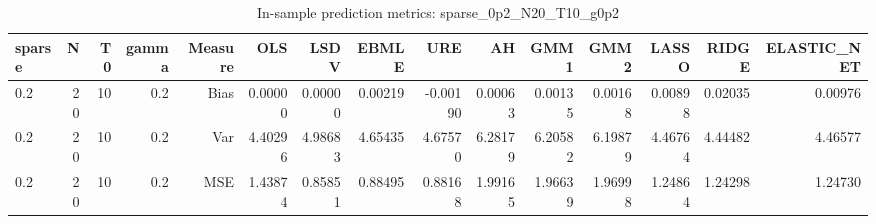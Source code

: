 \begin{table}[!htbp]\centering
\caption{In-sample prediction metrics: sparse_0p2_N20_T10_g0p2}
\label{tab:table2_sparse_0p2_N20_T10_g0p2}
\begin{tabular}{lrrrrrrrrrrrrrr}
\hline
sparse & N & T0 & gamma & Measure & OLS & LSDV & EBMLE & URE & AH & GMM1 & GMM2 & LASSO & RIDGE & ELASTIC_NET \\
\hline
0.2 & 20 & 10 & 0.2 & Bias & 0.00000 & 0.00000 & 0.00219 & -0.00190 & 0.00063 & 0.00135 & 0.00168 & 0.00898 & 0.02035 & 0.00976 \\
0.2 & 20 & 10 & 0.2 & Var & 4.40296 & 4.98683 & 4.65435 & 4.67570 & 6.28179 & 6.20582 & 6.19879 & 4.46764 & 4.44482 & 4.46577 \\
0.2 & 20 & 10 & 0.2 & MSE & 1.43874 & 0.85851 & 0.88495 & 0.88168 & 1.99165 & 1.96639 & 1.96998 & 1.24864 & 1.24298 & 1.24730 \\
\hline
\end{tabular}
\end{table}

